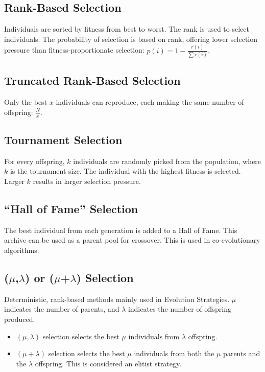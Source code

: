 \subsection*{Rank-Based Selection}
Individuals are sorted by fitness from best to worst. The rank is used to select individuals. The probability of selection is based on rank, offering lower selection pressure than fitness-proportionate selection: \(p(i) = 1 - \frac{r(i)}{\sum r(i)}\).

\subsection*{Truncated Rank-Based Selection}
Only the best \(x\) individuals can reproduce, each making the same number of offspring: \(\frac{N}{x}\).

\subsection*{Tournament Selection}
For every offspring, \(k\) individuals are randomly picked from the population, where \(k\) is the tournament size. The individual with the highest fitness is selected.  Larger \(k\) results in larger selection pressure.

\subsection*{“Hall of Fame” Selection}
The best individual from each generation is added to a Hall of Fame.  This archive can be used as a parent pool for crossover. This is used in co-evolutionary algorithms.

\subsection*{($\mu$,$\lambda$) or ($\mu$+$\lambda$) Selection}
Deterministic, rank-based methods mainly used in Evolution Strategies. $\mu$ indicates the number of parents, and $\lambda$ indicates the number of offspring produced.
\begin{itemize}
    \item \((\mu, \lambda)\) selection selects the best $\mu$ individuals from $\lambda$ offspring.
    \item \((\mu + \lambda)\) selection selects the best $\mu$ individuals from both the $\mu$ parents and the $\lambda$ offspring. This is considered an elitist strategy.
\end{itemize}

